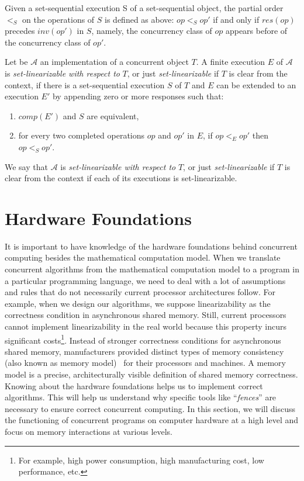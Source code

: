 Given a set-sequential execution S of a set-sequential object, the partial order \(<_S\) on the operations of \(S\) is defined as above: \(op <_S op'\) if and only if \(res(op)\) precedes \(inv(op')\) in \(S\), namely, the concurrency class of \(op\) appears before of the concurrency class of \(op'\).


\begin{definition}
    Let be \(\mathcal{A}\) an implementation of a concurrent object \(T\). A finite execution \(E\) of \(\mathcal{A}\) is \emph{set-linearizable with respect to} \(T\), or just \emph{set-linearizable} if \(T\) is clear from the context, if there is a set-sequential execution \(S\) of \(T\) and \(E\) can be extended to an execution \(E'\) by appending zero or more responses such that:

    \begin{enumerate}
        \item \(comp(E')\) and \(S\) are equivalent,
        \item for every two completed operations \(op\) and \(op'\) in \(E\), if \(op <_E op'\) then \(op <_S op'\).
    \end{enumerate}

    We say that \(\mathcal{A}\) is \emph{set-linearizable with respect to} \(T\), or just \emph{set-linearizable} if \(T\) is clear from the context if each of its executions is set-linearizable.
\end{definition}

\section{\label{sec:hardware-foundations}Hardware Foundations}

It is important to have knowledge of the hardware foundations behind concurrent computing besides the mathematical computation model. When we translate concurrent algorithms from the mathematical computation model to a program in a particular programming language, we need to deal with a lot of assumptions and rules that do not necessarily current processor architectures follow. For example, when we design our algorithms, we suppose linearizability as the correctness condition in asynchronous shared memory. Still, current processors cannot implement linearizability in the real world because this property incurs significant costs\footnote{For example, high power consumption, high manufacturing cost, low performance, etc.}. Instead of stronger correctness conditions for asynchronous shared memory, manufacturers provided distinct types of memory consistency (also known as memory model)~\cite{DBLP_series_synthesis_2020Nagarajan, DBLP_series_synthesis_2013Scott} for their processors and machines. A memory model is a precise, architecturally visible definition of shared memory correctness. Knowing about the hardware foundations helps us to implement correct algorithms. This will help us understand why specific tools like ``\emph{fences}'' are necessary to ensure correct concurrent computing. In this section, we will discuss the functioning of concurrent programs on computer hardware at a high level and focus on memory interactions at various levels.

